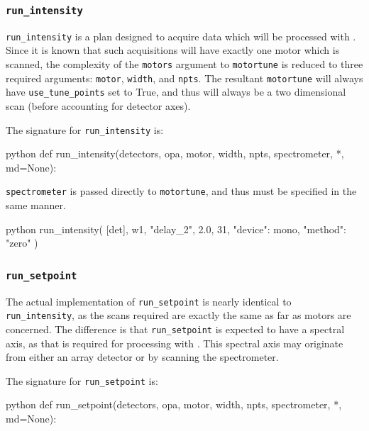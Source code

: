 \subsubsection{\texttt{run\_intensity}}

\texttt{run\_intensity} is a plan designed to acquire data which will be processed with .
Since it is known that such acquisitions will have exactly one motor which is scanned, the complexity of the \texttt{motors} argument to \texttt{motortune} is reduced to three required arguments: \texttt{motor}, \texttt{width}, and \texttt{npts}.
The resultant \texttt{motortune} will always have \texttt{use\_tune\_points} set to True, and thus will always be a two dimensional scan (before accounting for detector axes).

The signature for \texttt{run\_intensity} is:

\begin{codefragment}{python}
def run_intensity(detectors, opa, motor, width, npts, spectrometer, *, md=None):
\end{codefragment}

\texttt{spectrometer} is passed directly to \texttt{motortune}, and thus must be specified in the same manner.

\begin{codefragment}{python}
run_intensity(
    [det],
    w1,
    "delay_2",
    2.0,
    31,
    {"device": mono, "method": "zero"}
)
\end{codefragment}

\subsubsection{\texttt{run\_setpoint}}

The actual implementation of \texttt{run\_setpoint} is nearly identical to \texttt{run\_intensity}, as the scans required are exactly the same as far as motors are concerned.
The difference is that \texttt{run\_setpoint} is expected to have a spectral axis, as that is required for processing with .
This spectral axis may originate from either an array detector or by scanning the spectrometer.

The signature for \texttt{run\_setpoint} is:

\begin{codefragment}{python}
def run_setpoint(detectors, opa, motor, width, npts, spectrometer, *, md=None):
\end{codefragment}

